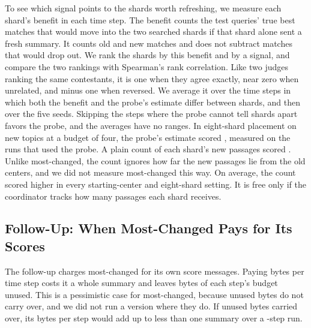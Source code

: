To see which signal points to the shards worth refreshing, we measure each shard's benefit in each time step.
The benefit counts the test queries' true best matches that would move into the two searched shards if that shard alone sent a fresh summary.
It counts old and new matches and does not subtract matches that would drop out.
We rank the \RNumNumShards{} shards by this benefit and by a signal, and compare the two rankings with Spearman's rank correlation.
Like two judges ranking the same contestants, it is one when they agree exactly, near zero when unrelated, and minus one when reversed.
We average it over the time steps in which both the benefit and the probe's estimate differ between shards, and then over the five seeds.
Skipping the steps where the probe cannot tell shards apart favors the probe, and the averages have no ranges.
In eight-shard placement on new topics at a budget of four, the probe's estimate scored \RNumSpearmanRNNewTopicMThree{}, measured on the runs that used the probe.
A plain count of each shard's new passages scored \RNumSpearmanNewVecsNewTopicMThree{}.
Unlike most-changed, the count ignores how far the new passages lie from the old centers, and we did not measure most-changed this way.
On average, the count scored higher in every starting-center and eight-shard setting.
It is free only if the coordinator tracks how many passages each shard receives.

\subsection{Follow-Up: When Most-Changed Pays for Its Scores}
\label{sec:follow}

The follow-up charges most-changed for its own score messages.
Paying \RNumDCScoreEpochBytes{} bytes per time step costs it a whole summary and leaves \RNumAddThreeDCUnspentEpochBytes{} bytes of each step's budget unused.
This is a pessimistic case for most-changed, because unused bytes do not carry over, and we did not run a version where they do.
If unused bytes carried over, its \RNumDCScoreEpochBytes{} bytes per step would add up to less than one summary over a \RNumNumEpochs{}-step run.

